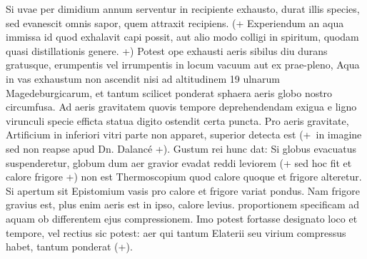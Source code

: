  \pstart {} Si uvae per dimidium annum  serventur in recipiente exhausto, durat illis  species, sed evanescit omnis sapor, quem attraxit recipiens. (+ Experiendum an aqua immissa id quod exhalavit capi possit, aut alio modo colligi in spiritum, quodam quasi distillationis genere. +)\pend \pstart {} Potest ope exhausti  aeris sibilus diu durans gratusque, erumpentis vel irrumpentis in locum vacuum aut ex prae-pleno, \pend \pstart {} Aqua in vas exhaustum  non ascendit nisi ad altitudinem 19 ulnarum  Magedeburgicarum, et tantum scilicet ponderat sphaera aeris\protect{} globo nostro circumfusa.\pend \pstart {} Ad aeris gravitatem\protect{}  quovis tempore deprehendendam exigua e ligno  virunculi specie efficta statua digito ostendit  certa puncta. Pro aeris gravitate\protect{}, Artificium in  inferiori vitri parte non apparet, superior detecta est (+~in imagine sed non reapse apud Dn. Dalanc\'{e}\protect{} +). Gustum rei hunc dat: Si globus evacuatus suspenderetur, globum dum aer gravior evadat  reddi leviorem (+ sed hoc fit et calore frigore +)  non est Thermoscopium quod calore quoque et frigore  alteretur. Si apertum sit Epistomium\protect{} vasis pro calore et frigore variat pondus. Nam frigore gravius  est, plus enim aeris est in ipso, calore levius.\pend \pstart {}  proportionem specificam ad aquam  ob differentem ejus compressionem. Imo  potest fortasse designato loco et tempore, vel  rectius sic potest: aer qui tantum Elaterii\protect{} seu  virium compressus habet, tantum ponderat (+).\pend 
